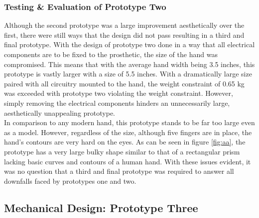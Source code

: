 \documentclass[11.5pt]{article}
\begin{document}
\subsubsection{Testing \& Evaluation of Prototype Two}

Although the second prototype was a large improvement aesthetically over the first, there were still ways that the design did not pass resulting in a third and final prototype. With the design of prototype two done in a way that all electrical components are to be fixed to the prosthetic, the size of the hand was compromised. This means that with the average hand width being 3.5 inches, this prototype is vastly larger with a size of 5.5 inches. With a dramatically large size paired with all circuitry mounted to the hand, the weight constraint of 0.65 kg was exceeded with prototype two violating the weight constraint. However, simply removing the electrical components hinders an unnecessarily large, aesthetically unappealing prototype.\\

In comparison to any modern hand, this prototype stands to be far too large even as a model. However, regardless of the size, although five fingers are in place, the hand's contours are very hard on the eyes. As can be seen in figure \ref{fig:aa}, the prototype has a very large bulky shape similar to that of a rectangular prism lacking basic curves and contours of a human hand. With these issues evident, it was no question that a third and final prototype was required to answer all downfalls faced by prototypes one and two.

\newpage

\subsection{Mechanical Design: Prototype Three}
\end{document}
